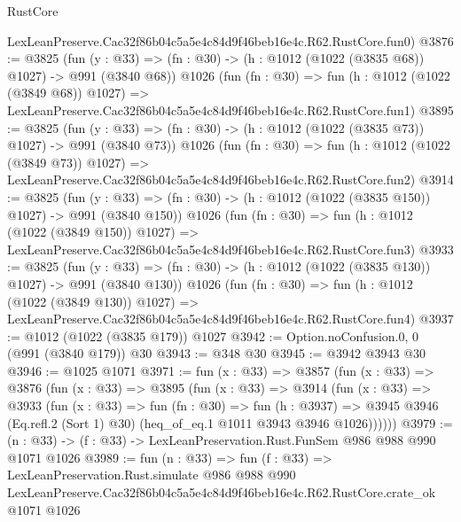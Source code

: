 \begin{lexlean}{RustCore}
\begin{coremodule}
    LexLeanPreserve.Cac32f86b04c5a5e4c84d9f46beb16e4c.R62.RustCore.fun0)
@3876 := @3825
    (fun (y : @33) => (fn : @30) -> (h : @1012 (@1022 (@3835 @68)) @1027) -> @991 (@3840 @68))
    @1026
    (fun (fn : @30) =>
    fun (h : @1012 (@1022 (@3849 @68)) @1027) =>
    LexLeanPreserve.Cac32f86b04c5a5e4c84d9f46beb16e4c.R62.RustCore.fun1)
@3895 := @3825
    (fun (y : @33) => (fn : @30) -> (h : @1012 (@1022 (@3835 @73)) @1027) -> @991 (@3840 @73))
    @1026
    (fun (fn : @30) =>
    fun (h : @1012 (@1022 (@3849 @73)) @1027) =>
    LexLeanPreserve.Cac32f86b04c5a5e4c84d9f46beb16e4c.R62.RustCore.fun2)
@3914 := @3825
    (fun (y : @33) => (fn : @30) -> (h : @1012 (@1022 (@3835 @150)) @1027) -> @991 (@3840 @150))
    @1026
    (fun (fn : @30) =>
    fun (h : @1012 (@1022 (@3849 @150)) @1027) =>
    LexLeanPreserve.Cac32f86b04c5a5e4c84d9f46beb16e4c.R62.RustCore.fun3)
@3933 := @3825
    (fun (y : @33) => (fn : @30) -> (h : @1012 (@1022 (@3835 @130)) @1027) -> @991 (@3840 @130))
    @1026
    (fun (fn : @30) =>
    fun (h : @1012 (@1022 (@3849 @130)) @1027) =>
    LexLeanPreserve.Cac32f86b04c5a5e4c84d9f46beb16e4c.R62.RustCore.fun4)
@3937 := @1012 (@1022 (@3835 @179)) @1027
@3942 := Option.noConfusion.{0, 0} (@991 (@3840 @179)) @30
@3943 := @348 @30
@3945 := @3942 @3943 @30
@3946 := @1025 @1071
@3971 := fun (x : @33) =>
  @3857
    (fun (x : @33) =>
    @3876
      (fun (x : @33) =>
      @3895
        (fun (x : @33) =>
        @3914
          (fun (x : @33) =>
          @3933
            (fun (x : @33) =>
            fun (fn : @30) =>
            fun (h : @3937) =>
            @3945 @3946 (Eq.refl.{2} (Sort 1) @30) (heq_of_eq.{1} @1011 @3943 @3946 @1026))))))
@3979 := (n : @33) -> (f : @33) -> LexLeanPreservation.Rust.FunSem @986 @988 @990 @1071 @1026
@3989 := fun (n : @33) =>
  fun (f : @33) =>
  LexLeanPreservation.Rust.simulate
    @986
    @988
    @990
    LexLeanPreserve.Cac32f86b04c5a5e4c84d9f46beb16e4c.R62.RustCore.crate_ok
    @1071
    @1026
\end{coremodule}
\end{lexlean}
